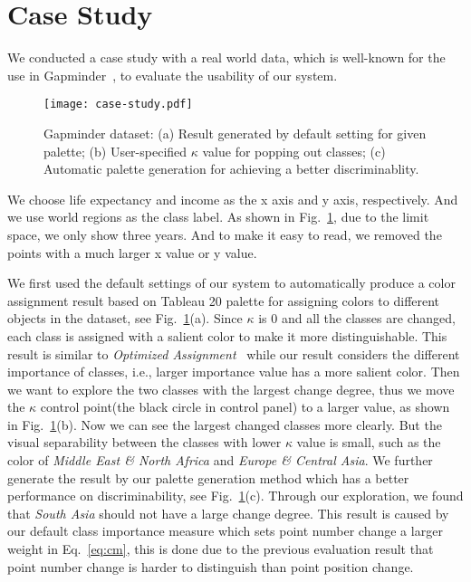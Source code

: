 \section{Case Study}
\label{sec:caseStudy}
We conducted a case study with a real world data, which is well-known for the use in Gapminder~\cite{gapminder}, to evaluate the usability of our system.

\vspace{-4mm}
\begin{figure}[h]
\centering
\texttt{[image: case-study.pdf]}
\caption{Gapminder dataset: (a) Result generated by default setting for given palette; (b) User-specified $\kappa$ value for popping out classes; (c) Automatic palette generation for achieving a better discriminablity.}
\label{fig:casestudy}
\vspace{-4mm}
\end{figure}
We choose life expectancy and income as the x axis and y axis, respectively. And we use world regions as the class label. As shown in Fig.~\ref{fig:casestudy}, due to the limit space, we only show three years. And to make it easy to read, we removed the points with a much larger x value or y value.

We first used the default settings of our system to automatically produce a color assignment result based on Tableau 20 palette for assigning colors to different objects in the dataset, see Fig.~\ref{fig:casestudy}(a). Since $\kappa$ is $0$ and all the classes are changed, each class is assigned with a salient color to make it more distinguishable. This result is similar to \emph{Optimized Assignment}~\cite{Wang2018} while our result considers the different importance of classes, i.e., larger importance value has a more salient color.
Then we want to explore the two classes with the largest change degree, thus we move the $\kappa$ control point(the black circle in control panel) to a larger value, as shown in Fig.~\ref{fig:casestudy}(b). Now we can see the largest changed classes more clearly. But the visual separability between the classes with lower $\kappa$ value is small, such as the color of \emph{Middle East \& North Africa} and \emph{Europe \& Central Asia}. We further generate the result by our palette generation method which has a better performance on discriminability, see Fig.~\ref{fig:casestudy}(c).
Through our exploration, we found that \emph{South Asia} should not have a large change degree. This result is caused by our default class importance measure which sets point number change a larger weight in Eq.~\ref{eq:cm}, this is done due to the previous evaluation result that point number change is harder to distinguish than point position change.

